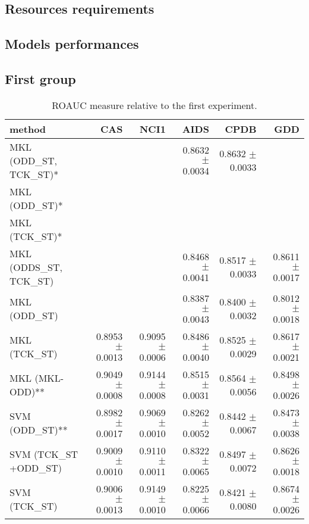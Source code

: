 \subsection{Resources requirements}

\subsection{Models performances}

\subsection{First group}

\begin{landscape}
    \begin{table}[ht]
        \centering
        \begin{tabular}{|l|r|r|r|r|r|}
            \hline
            method&CAS&NCI1&AIDS&CPDB&GDD\\
            \hline
            MKL (ODD\_ST, TCK\_ST)* &&&0.8632 $\pm$ 0.0034&0.8632 $\pm$ 0.0033&\\
            \hline
            MKL (ODD\_ST)*&&&&&\\
            \hline
            MKL (TCK\_ST)*&&&&&\\
            \hline
            MKL (ODDS\_ST, TCK\_ST)&&&0.8468 $\pm$ 0.0041&0.8517 $\pm$ 0.0033&0.8611 $\pm$ 0.0017\\
            \hline
            MKL (ODD\_ST)&&&0.8387 $\pm$ 0.0043&0.8400 $\pm$ 0.0032&0.8012$\pm$ 0.0018\\
            \hline
            MKL (TCK\_ST)&0.8953 $\pm$ 0.0013&0.9095 $\pm$ 0.0006&0.8486 $\pm$ 0.0040&0.8525 $\pm$ 0.0029&0.8617 $\pm$ 0.0021\\
            \hline
            MKL (MKL-ODD)** &0.9049 $\pm$ 0.0008&0.9144 $\pm$ 0.0008&0.8515 $\pm$ 0.0031&0.8564 $\pm$ 0.0056&0.8498 $\pm$ 0.0026\\
            \hline
            SVM (ODD\_ST)** &0.8982 $\pm$ 0.0017&0.9069 $\pm$ 0.0010&0.8262 $\pm$ 0.0052&0.8442 $\pm$ 0.0067&0.8473 $\pm$ 0.0038\\
            \hline
            SVM (TCK\_ST +ODD\_ST)&0.9009 $\pm$ 0.0010&0.9110 $\pm$ 0.0011&0.8322 $\pm$ 0.0065&0.8497 $\pm$ 0.0072&0.8626 $\pm$ 0.0018\\
            \hline
            SVM (TCK\_ST)&0.9006 $\pm$ 0.0013&0.9149 $\pm$ 0.0010&0.8225 $\pm$ 0.0066&0.8421 $\pm$ 0.0080&0.8674 $\pm$ 0.0026\\
            \hline
        \end{tabular}
        \label{table:results_st}
        \caption{ROAUC measure relative to the first experiment. }


\end{table}
\end{landscape}
